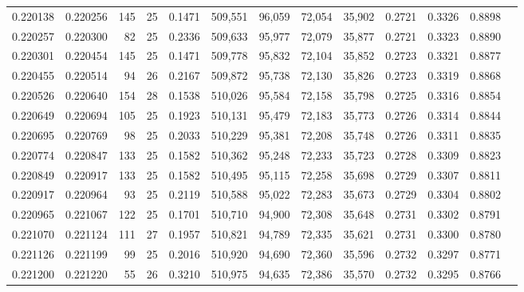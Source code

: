 \begin{tabular}{rrrrrrrrrrrrr}
0.220138 & 0.220256 & 145 &  25 &                                     0.1471 & 509,551 &  96,059 &  72,054 &  35,902 & 0.2721 & 0.3326 & 0.8898 \\
0.220257 & 0.220300 &  82 &  25 &                                     0.2336 & 509,633 &  95,977 &  72,079 &  35,877 & 0.2721 & 0.3323 & 0.8890 \\
0.220301 & 0.220454 & 145 &  25 &                                     0.1471 & 509,778 &  95,832 &  72,104 &  35,852 & 0.2723 & 0.3321 & 0.8877 \\
0.220455 & 0.220514 &  94 &  26 &                                     0.2167 & 509,872 &  95,738 &  72,130 &  35,826 & 0.2723 & 0.3319 & 0.8868 \\
0.220526 & 0.220640 & 154 &  28 &                                     0.1538 & 510,026 &  95,584 &  72,158 &  35,798 & 0.2725 & 0.3316 & 0.8854 \\
0.220649 & 0.220694 & 105 &  25 &                                     0.1923 & 510,131 &  95,479 &  72,183 &  35,773 & 0.2726 & 0.3314 & 0.8844 \\
0.220695 & 0.220769 &  98 &  25 &                                     0.2033 & 510,229 &  95,381 &  72,208 &  35,748 & 0.2726 & 0.3311 & 0.8835 \\
0.220774 & 0.220847 & 133 &  25 &                                     0.1582 & 510,362 &  95,248 &  72,233 &  35,723 & 0.2728 & 0.3309 & 0.8823 \\
0.220849 & 0.220917 & 133 &  25 &                                     0.1582 & 510,495 &  95,115 &  72,258 &  35,698 & 0.2729 & 0.3307 & 0.8811 \\
0.220917 & 0.220964 &  93 &  25 &                                     0.2119 & 510,588 &  95,022 &  72,283 &  35,673 & 0.2729 & 0.3304 & 0.8802 \\
0.220965 & 0.221067 & 122 &  25 &                                     0.1701 & 510,710 &  94,900 &  72,308 &  35,648 & 0.2731 & 0.3302 & 0.8791 \\
0.221070 & 0.221124 & 111 &  27 &                                     0.1957 & 510,821 &  94,789 &  72,335 &  35,621 & 0.2731 & 0.3300 & 0.8780 \\
0.221126 & 0.221199 &  99 &  25 &                                     0.2016 & 510,920 &  94,690 &  72,360 &  35,596 & 0.2732 & 0.3297 & 0.8771 \\
0.221200 & 0.221220 &  55 &  26 &                                     0.3210 & 510,975 &  94,635 &  72,386 &  35,570 & 0.2732 & 0.3295 & 0.8766 \\

\end{tabular}
